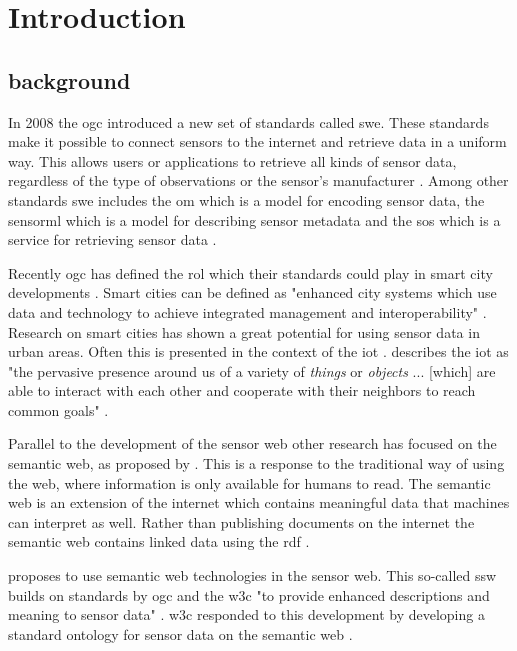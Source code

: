 
\chapter{Introduction}
\label{chap:introduction}

\section{background}
In 2008 the \ac{ogc} introduced a new set of standards called \ac{swe}. These standards make it possible to connect sensors to the internet and retrieve data in a uniform way. This allows users or applications to retrieve all kinds of sensor data, regardless of the type of observations or the sensor's manufacturer \citep{SW:Botts}. Among other standards \ac{swe} includes the \ac{om} which is a model for encoding sensor data, the \ac{sensorml} which is a model for describing sensor metadata and the \ac{sos} which is a service for retrieving sensor data \citep{SW:OGC}. 

Recently \ac{ogc} has defined the rol which their standards could play in smart city developments \citep{SC:OGC}. Smart cities can be defined as "enhanced city systems which use data and technology to achieve integrated management and interoperability" \citep[p. 18]{SC:Moir}. Research on smart cities has shown a great potential for using sensor data in urban areas. Often this is presented in the context of the \ac{iot} \citep{IOT:Zanelli, SSW:Perera}. \cite{IOT:Atzori} describes the \ac{iot} as "the pervasive presence around us of a variety of \textit{things} or \textit{objects} ... [which] are able to interact with each other and cooperate with their neighbors to reach common goals" \cite[p. 2787]{IOT:Atzori}. 

Parallel to the development of the sensor web other research has focused on the semantic web, as proposed by \cite{LD:Berners-lee}. This is a response to the traditional way of using the web, where information is only available for humans to read. The semantic web is an extension of the internet which contains meaningful data that machines can interpret as well. Rather than publishing documents on the internet the semantic web contains linked data using the \ac{rdf} \citep{LD:Bizer}.    

\cite{SSW:Sheth} proposes to use semantic web technologies in the sensor web. This so-called \ac{ssw} builds on standards by \ac{ogc} and the \ac{w3c} "to provide enhanced descriptions and meaning to sensor data" \cite[p.78]{SSW:Sheth}. \ac{w3c} responded to this development by developing a standard ontology for sensor data on the semantic web \cite{SSW:SSN_incubatorGroup}. \\
 
